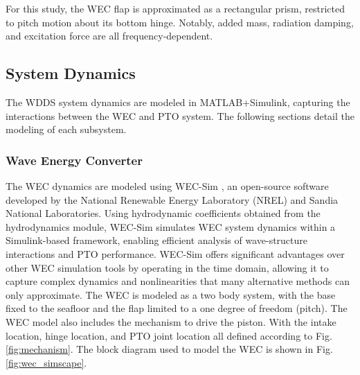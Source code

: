 \documentclass[twocolumn,10pt]{asme2e}
\begin{document}
For this study, the WEC flap is approximated as a rectangular prism, restricted to pitch motion about its bottom hinge. Notably, added mass, radiation damping, and excitation force are all frequency-dependent.


\subsection{System Dynamics} \label{sec:sysdyn}

The WDDS system dynamics are modeled in MATLAB+Simulink, capturing the interactions between the WEC and PTO system. The following sections detail the modeling of each subsystem.

\subsubsection{Wave Energy Converter}

The WEC dynamics are modeled using WEC-Sim \cite{wecsim}, an open-source software developed by the National Renewable Energy Laboratory (NREL) and Sandia National Laboratories. Using hydrodynamic coefficients obtained from the hydrodynamics module, WEC-Sim simulates WEC system dynamics within a Simulink-based framework, enabling efficient analysis of wave-structure interactions and PTO performance. WEC-Sim offers significant advantages over other WEC simulation tools by operating in the time domain, allowing it to capture complex dynamics and nonlinearities that many alternative methods can only approximate. The WEC is modeled as a two body system, with the base fixed to the seafloor and the flap limited to a one degree of freedom (pitch). The WEC model also includes the mechanism to drive the piston. With the intake location, hinge location, and PTO joint location all defined according to Fig. \ref{fig:mechanism}. The block diagram used to model the WEC is shown in Fig. \ref{fig:wec_simscape}.
\end{document}
